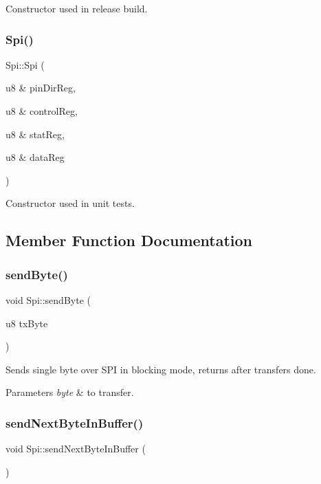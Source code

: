 Constructor used in release build. \mbox{\label{class_spi_aa5bff4855080ca494dda262669931973}} 
\subsubsection{\texorpdfstring{Spi()}{Spi()}\hspace{0.1cm}{\footnotesize\ttfamily [2/2]}}
{\footnotesize\ttfamily Spi\+::\+Spi (\begin{DoxyParamCaption}\item[{u8 \&}]{pin\+Dir\+Reg,  }\item[{u8 \&}]{control\+Reg,  }\item[{u8 \&}]{stat\+Reg,  }\item[{u8 \&}]{data\+Reg }\end{DoxyParamCaption})}

Constructor used in unit tests. 

\subsection{Member Function Documentation}
\mbox{\label{class_spi_af95597dbf2ad61755808ea6d87e587f1}} 
\subsubsection{\texorpdfstring{sendByte()}{sendByte()}}
{\footnotesize\ttfamily void Spi\+::send\+Byte (\begin{DoxyParamCaption}\item[{u8}]{tx\+Byte }\end{DoxyParamCaption})}

Sends single byte over S\+PI in blocking mode, returns after transfer\textquotesingle{}s done. 
\begin{DoxyParams}{Parameters}
{\em byte} & to transfer. \\
\hline
\end{DoxyParams}
\mbox{\label{class_spi_ad356e46ffdf7cc7d674eb871f05e8b0d}} 
\subsubsection{\texorpdfstring{sendNextByteInBuffer()}{sendNextByteInBuffer()}}
{\footnotesize\ttfamily void Spi\+::send\+Next\+Byte\+In\+Buffer (\begin{DoxyParamCaption}{ }\end{DoxyParamCaption})}

